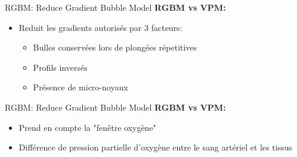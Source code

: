 \begin{frame}{RGBM: Reduce Gradient Bubble Model}  
	\textbf{RGBM vs VPM:}
	\begin{itemize}
		\item Reduit les gradients autorisés par 3 facteurs:
		\begin{itemize}
			\item Bulles conservées lors de plongées répetitives
			\item Profils inversés
			\item Présence de micro-noyaux
		\end{itemize}
	\end{itemize}
\end{frame}

\begin{frame}{RGBM: Reduce Gradient Bubble Model}  
	\textbf{RGBM vs VPM:}
	\begin{itemize}
		\item Prend en compte la "fenêtre oxygène"
		\item Différence de pression partielle d'oxygène entre le sang artériel et les tissus
	\end{itemize}
\end{frame}